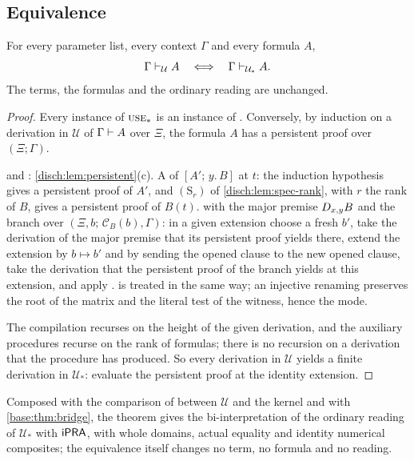 \subsection{Equivalence}

\begin{theorem}
\label{disch:thm:spec}
For every parameter list, every context $\Gamma$ and every formula $A$,
\[
 \Gamma\vdash_{\mathcal U}A\quad\Longleftrightarrow\quad
 \Gamma\vdash_{\mathcal U_*}A .
\]
The terms, the formulas and the ordinary reading are unchanged.
\end{theorem}

\begin{proof}
Every instance of $\rulename{Use}_*$ is an instance of .
Conversely, by induction on a derivation in $\mathcal U$ of
$\Gamma\vdash A$ over $\Xi$, the formula $A$ has a persistent proof over
$(\Xi;\Gamma)$.

 and : \cref{disch:lem:persistent}(c). A
 of $[A';\,y.\,B]$ at $t$: the induction hypothesis gives a
persistent proof of $A'$, and $(\mathrm S_r)$ of
\cref{disch:lem:spec-rank}, with $r$ the rank of $B$, gives a persistent
proof of $B(t)$.  with the major premise $D_{x,y}B$ and the
branch over $(\Xi,b;\,\mathcal C_B(b),\Gamma)$: in a given extension
choose a fresh $b'$, take the derivation of the major premise that its
persistent proof yields there, extend the extension by $b\mapsto b'$ and
by sending the opened clause to the new opened clause, take the derivation
that the persistent proof of the branch yields at this extension, and
apply .  is treated in the same way; an
injective renaming preserves the root of the matrix and the literal test
of the witness, hence the mode.

The compilation recurses on the height of the given derivation, and the
auxiliary procedures recurse on the rank of formulas; there is no
recursion on a derivation that the procedure has produced. So every
derivation in $\mathcal U$ yields a finite derivation in $\mathcal U_*$:
evaluate the persistent proof at the identity extension.
\end{proof}

Composed with the comparison of  between $\mathcal U$
and the kernel and with \cref{base:thm:bridge}, the theorem gives the
bi-interpretation of the ordinary reading of $\mathcal U_*$ with $\mathsf{iPRA}$,
with whole domains, actual equality and identity numerical composites; the
equivalence itself changes no term, no formula and no reading.

